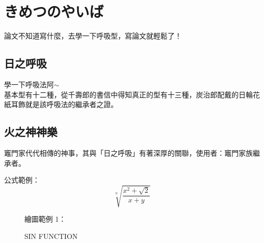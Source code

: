 \chapter{きめつのやいば}\label{structure}

論文不知道寫什麼，去學一下呼吸型，寫論文就輕鬆了！

\section{日之呼吸}
學一下呼吸法阿$\sim$ \\
基本型有十二種，從千壽郎的書信中得知真正的型有十三種，炭治郎配戴的日輪花紙耳飾就是該呼吸法的繼承者之證。

\section{火之神神樂}
竈門家代代相傳的神事，其與「日之呼吸」有著深厚的關聯，使用者：竈門家族繼承者。

公式範例：
\begin{equation}
   \sqrt[n]{\frac{x^2+\sqrt 2}{x+y}}
\end{equation}

\begin{figure}
繪圖範例 1：\\[1em]
   \centering
      \pgfplotsset{width=6cm}          %
   \caption{\edukai SIN FUNCTION}\label{fig:SIN FUNCTION}
\end{figure}
